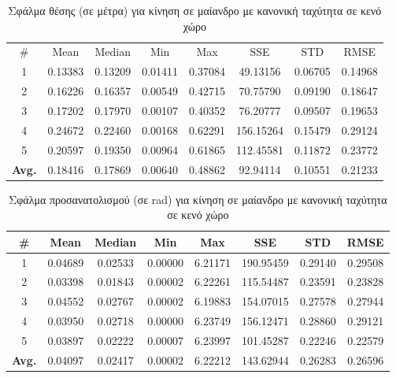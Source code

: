 \begin{table}[H]
    \begin{center}
        \centering
        \caption{Σφάλμα θέσης (σε μέτρα) για κίνηση σε μαίανδρο με κανονική ταχύτητα σε κενό χώρο}
        \label{tab:position_error_meander_normal_box}
        \begin{tabular}{| c | c | c | c | c | c | c | c | }
        \hline
        \rowcolor{Gray}
        \# & Mean & Median & Min & Max & SSE & STD & RMSE \\
        1 & 0.13383 & 0.13209 & 0.01411 & 0.37084 & 49.13156 & 0.06705 & 0.14968 \\
        2 & 0.16226 & 0.16357 & 0.00549 & 0.42715 & 70.75790 & 0.09190 & 0.18647 \\
        3 & 0.17202 & 0.17970 & 0.00107 & 0.40352 & 76.20777 & 0.09507 & 0.19653 \\
        4 & 0.24672 & 0.22460 & 0.00168 & 0.62291 & 156.15264 & 0.15479 & 0.29124 \\
        5 & 0.20597 & 0.19350 & 0.00964 & 0.61865 & 112.45581 & 0.11872 & 0.23772 \\
        \hline
        \textbf{Avg.} & 0.18416 & 0.17869 & 0.00640 & 0.48862 & 92.94114 & 0.10551 & 0.21233 \\
        \hline
        \end{tabular}
    \end{center}
\end{table}

\begin{table}[H]
    \centering
    \caption{Σφάλμα προσανατολισμού (σε rad) για κίνηση σε μαίανδρο με κανονική ταχύτητα σε κενό χώρο}
    \label{tab:orientation_error_meander_normal_box}
    \begin{tabular}{| c | c | c | c | c | c | c | c | }
        \hline
        \rowcolor{Gray}
        \# & Mean & Median & Min & Max & SSE & STD & RMSE \\
        \hline
        1 & 0.04689 & 0.02533 & 0.00000 & 6.21171 & 190.95459 & 0.29140 & 0.29508 \\
        2 & 0.03398 & 0.01843 & 0.00002 & 6.22261 & 115.54487 & 0.23591 & 0.23828 \\
        3 & 0.04552 & 0.02767 & 0.00002 & 6.19883 & 154.07015 & 0.27578 & 0.27944 \\
        4 & 0.03950 & 0.02718 & 0.00000 & 6.23749 & 156.12471 & 0.28860 & 0.29121 \\
        5 & 0.03897 & 0.02222 & 0.00007 & 6.23997 & 101.45287 & 0.22246 & 0.22579 \\
        \hline
        \textbf{Avg.} & 0.04097 & 0.02417 & 0.00002 & 6.22212 & 143.62944 & 0.26283 & 0.26596 \\
        \hline
    \end{tabular}
\end{table}

